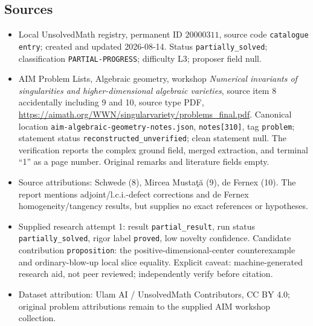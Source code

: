 \documentclass[11pt]{article}
\begin{document}
\subsection{Sources}
\begin{itemize}
\item Local UnsolvedMath registry, permanent ID $20000311$, source code \texttt{catalogue entry}; created and updated 2026-08-14. Status \texttt{partially\_solved}; classification \texttt{PARTIAL-PROGRESS}; difficulty L3; proposer field null.
\item AIM Problem Lists, Algebraic geometry, workshop \emph{Numerical invariants of singularities and higher-dimensional algebraic varieties}, source item 8 accidentally including 9 and 10, source type PDF, \url{https://aimath.org/WWN/singularvariety/problems_final.pdf}. Canonical location \texttt{aim-algebraic-geometry-notes.json}, \texttt{notes[310]}, tag \texttt{problem}; statement status \texttt{reconstructed\_unverified}; clean statement null. The verification reports the complex ground field, merged extraction, and terminal ``1'' as a page number. Original remarks and literature fields empty.
\item Source attributions: Schwede (8), Mircea Musta\c t\u a (9), de Fernex (10). The report mentions adjoint/l.c.i.-defect corrections and de Fernex homogeneity/tangency results, but supplies no exact references or hypotheses.
\item Supplied research attempt 1: result \texttt{partial\_result}, run status \texttt{partially\_solved}, rigor label \texttt{proved}, low novelty confidence. Candidate contribution \texttt{proposition}: the positive-dimensional-center counterexample and ordinary-blow-up local slice equality. Explicit caveat: machine-generated research aid, not peer reviewed; independently verify before citation.
\item Dataset attribution: Ulam AI / UnsolvedMath Contributors, CC BY 4.0; original problem attributions remain to the supplied AIM workshop collection.
\end{itemize}
\end{document}

